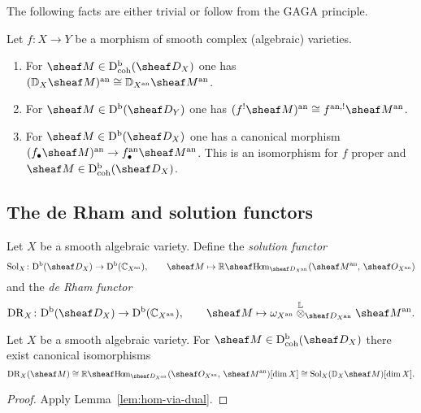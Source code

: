 \documentclass[number-in-sections,a4paper]{notes}
\begin{document}
The following facts are either trivial or follow from the GAGA principle.

\begin{Facts}
    Let $f\colon X \to Y$ be a morphism of smooth complex (algebraic) varieties.
    \begin{enumerate}
        \item For $\sheaf M \in \catDbDModcoh{X}$ one has $(\DD_X\sheaf M)^\an \cong \DD_{X^\an}\sheaf  M^\an$.
        \item For $\sheaf M \in \catDbDMod{Y}$ one has $(f^!\sheaf M)^\an \cong f^{\an,!}\sheaf M^\an$.
        \item For $\sheaf M \in \catDbDMod{X}$ one has a canonical morphism $(f_\bullet\sheaf M)^\an \to f^{\an}_\bullet\sheaf M^\an$.
            This is an isomorphism for $f$ proper and $\sheaf M \in \catDbDModcoh{X}$.
    \end{enumerate}
\end{Facts}

\subsection{The de Rham and solution functors}

\begin{Definition}
    Let $X$ be a smooth algebraic variety.
    Define the \emph{solution functor}
    \[
        \Sol_X\colon \catDbDMod{X} \to \catDbCMod{X^\an}, \qquad \sheaf M \mapsto \RsheafHom_{\sD_{X^\an}}(\sheaf M^\an,\, \sO_{X^\an})
    \]
    and the \emph{de Rham functor}
    \[
        \DR_X\colon \catDbDMod{X} \to \catDbCMod{X^\an}, \qquad \sheaf M \mapsto \canon_{X^\an} \Lotimes_{\sD_{X^\an}} \sheaf M^\an.
    \]
\end{Definition}

\begin{Lemma}\label{lem:dR_and_sol}
    Let $X$ be a smooth algebraic variety.
    For $\sheaf M \in \catDbDModcoh{X}$ there exist canonical isomorphisms
    \[
        \DR_X(\sheaf M) \cong
        \sheafRHom_{\sD_{X^\an}}(\sO_{X^\an},\, \sheaf M^\an)[\dim X] \cong
        \Sol_X(\DD_X\sheaf M)[\dim X].
    \]
\end{Lemma}

\begin{proof}
    Apply Lemma~\ref{lem:hom-via-dual}.
\end{proof}
\end{document}
